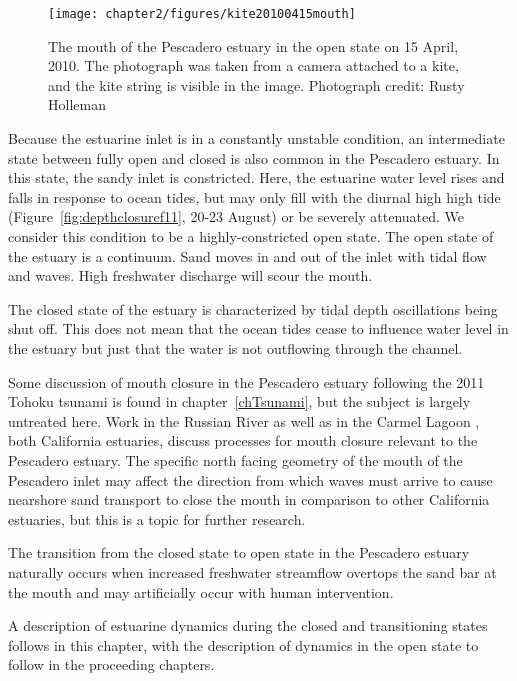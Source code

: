\begin{figure}
	\begin{center}
		\texttt{[image: chapter2/figures/kite20100415mouth]} 
	\end{center}
\caption{The mouth of the Pescadero estuary in the open state on 15 April, 2010. The photograph was taken from a camera attached to a kite, and the kite string is visible in the image. Photograph credit: Rusty Holleman}\label{fig:kite_photos_open} \end{figure}

Because the estuarine inlet is in a constantly unstable condition, an intermediate state between fully open and closed is also common in the Pescadero estuary.  In this state, the sandy inlet is constricted. Here, the estuarine water level rises and falls in response to ocean tides, but may only fill with the diurnal high high tide (Figure~\ref{fig:depthclosuref11}, 20-23 August) or be severely attenuated. We consider this condition to be a highly-constricted open state. The open state of the estuary is a continuum. Sand moves in and out of the inlet with tidal flow and waves. High freshwater discharge will scour the mouth.

The closed state of the estuary is characterized by tidal depth oscillations being shut off. This does not mean that the ocean tides cease to influence water level in the estuary but just that the water is not outflowing through the channel.

Some discussion of mouth closure in the Pescadero estuary following the 2011 Tohoku tsunami is found in chapter~\ref{chTsunami}, but the subject is largely untreated here. Work in the Russian River \parencite{behrens_russian_2012, behrens_episodic_2013} as well as in the Carmel Lagoon \parencite{rich_hydrologic_2013}, both California estuaries, discuss processes for mouth closure relevant to the Pescadero estuary. The specific north facing geometry of the mouth of the Pescadero inlet may affect the direction from which waves must arrive to cause nearshore sand transport to close the mouth in comparison to other California estuaries, but this is a topic for further research.

The transition from the closed state to open state in the Pescadero estuary naturally occurs when increased freshwater streamflow overtops the sand bar at the mouth and may artificially occur with human intervention. 

A description of estuarine dynamics during the closed and transitioning states follows in this chapter, with the description of dynamics in the open state to follow in the proceeding chapters.


